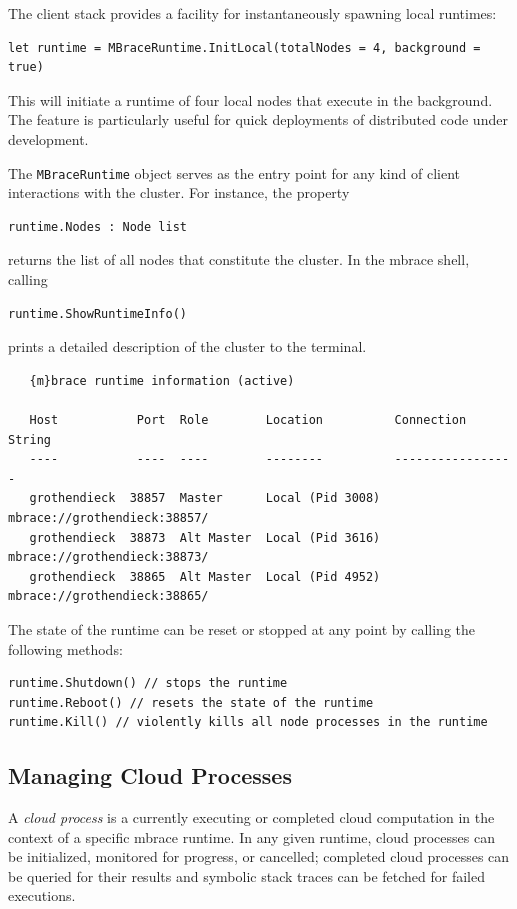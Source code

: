 \documentclass[9pt,a4paper]{article}
\newcommand{\mbrace}{mbrace}
\begin{document}
The client stack provides a facility for instantaneously spawning local runtimes:
\begin{lstlisting}
let runtime = MBraceRuntime.InitLocal(totalNodes = 4, background = true)
\end{lstlisting}
This will initiate a runtime of four local nodes that execute in the background.
The feature is particularly useful for quick deployments of distributed code under development.

The \texttt{MBraceRuntime} object serves as the entry point for any kind of client interactions 
with the cluster. For instance, the property
\begin{lstlisting}
runtime.Nodes : Node list
\end{lstlisting}
returns the list of all nodes that constitute the cluster.
In the \mbrace{} shell, calling
\begin{lstlisting}
runtime.ShowRuntimeInfo()
\end{lstlisting}
prints a detailed description of the cluster to the terminal.
\begin{verbatim}
   {m}brace runtime information (active)                                               

   Host           Port  Role        Location          Connection String            
   ----           ----  ----        --------          -----------------            
   grothendieck  38857  Master      Local (Pid 3008)  mbrace://grothendieck:38857/ 
   grothendieck  38873  Alt Master  Local (Pid 3616)  mbrace://grothendieck:38873/ 
   grothendieck  38865  Alt Master  Local (Pid 4952)  mbrace://grothendieck:38865/ 
\end{verbatim}
The state of the runtime can be reset or stopped at any point by calling the following methods:
\begin{lstlisting}
runtime.Shutdown() // stops the runtime
runtime.Reboot() // resets the state of the runtime
runtime.Kill() // violently kills all node processes in the runtime
\end{lstlisting}

\subsection{Managing Cloud Processes}

A \emph{cloud process} is a currently executing or completed cloud computation in the context
of a specific \mbrace{} runtime. In any given runtime, cloud processes can be initialized,
monitored for progress, or cancelled; completed cloud processes can be queried for their results
and symbolic stack traces can be fetched for failed executions.
\end{document}
